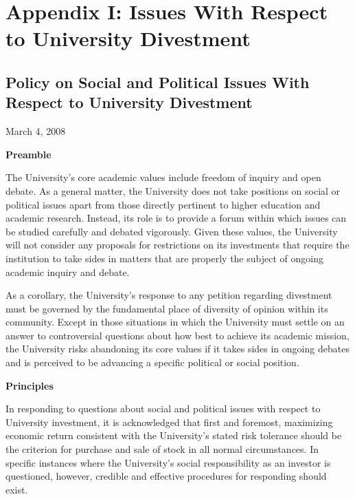 
		\section{Appendix I: Issues With Respect to University Divestment}
		
	\subsection{Policy on Social and Political Issues With Respect to University Divestment}


	
March 4, 2008



\textbf{Preamble}

 

The University's core academic values include freedom of inquiry and open debate. As a general matter, the University does not take positions on social or political issues apart from those directly pertinent to higher education and academic research.  Instead, its role is to provide a forum within which issues can be studied carefully and debated vigorously. Given these values, the University will not consider any proposals for restrictions on its investments that require the institution to take sides in matters that are properly the subject of ongoing academic inquiry and debate.

 

As a corollary, the University's response to any petition regarding divestment must be governed by the fundamental place of diversity of opinion within its community. Except in those situations in which the University must settle on an answer to controversial questions about how best to achieve its academic mission, the University risks abandoning its core values if it takes sides in ongoing debates and is perceived to be advancing a specific political or social position.



\textbf{Principles}

 

In responding to questions about social and political issues with respect to University investment, it is acknowledged that first and foremost, maximizing economic return consistent with the University’s stated risk tolerance should be the criterion for purchase and sale of stock in all normal circumstances. In specific instances where the University's social responsibility as an investor is questioned, however, credible and effective procedures for responding should exist.

